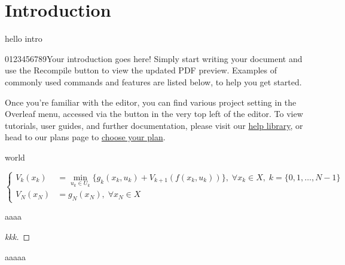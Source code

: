 \chapter{Introduction}
\begin{introduction}
\item hello intro
\end{introduction}
0123456789\newline Your introduction goes here! Simply start writing your document and use the Recompile button to view the updated PDF preview. Examples of commonly used commands and features are listed below, to help you get started.

Once you're familiar with the editor, you can find various project setting in the Overleaf menu, accessed via the button in the very top left of the editor. To view tutorials, user guides, and further documentation, please visit our \href{https://www.overleaf.com/learn}{help library}, or head to our plans page to \href{https://www.overleaf.com/user/subscription/plans}{choose your plan}.
\begin{theorem}[thm1]\label{thm:teo1}
\begin{assumption}[hello]
world
\end{assumption}
\begin{equation}
    \left\{\begin{aligned}
        V_{k}(x_{k})&=\underset{u_{k}\in U_{k}}{\min}\{
            g_{k}(x_{k},u_{k})+V_{k+1}(f(x_{k},u_{k}))\},\;
            \forall x_{k}\in X,\;k=\{0,1,\dots,N-1\}\\
        V_{N}(x_N)&=g_{N}(x_N),\;\forall x_{N}\in X
    \end{aligned}
    \right.
\end{equation}
\end{theorem}
\begin{definition}[def 1]
aaaa
\end{definition}
\begin{problem}[prob]

\end{problem}
\begin{corollary}[coro1]

\end{corollary}
\begin{proof}[kkk]

\end{proof}
\begin{property}[prop1]
aaaaa
\end{property}


